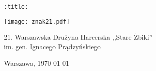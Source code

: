 \documentclass[a4paper,11pt]{extbook}
\begin{document}
\thispagestyle{empty}
\begin{center}
{\Huge\verb|:title:|}

\large

\texttt{[image: znak21.pdf]}

21. Warszawska Drużyna Harcerska ,,Stare Żbiki''\\
im. gen. Ignacego Prądzyńskiego

Warszawa, \today
{}
\end{center}

\cleardoublepage
\end{document}
